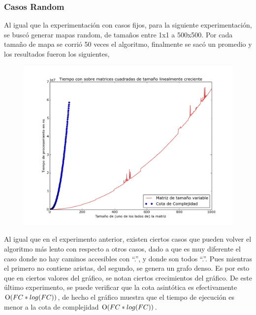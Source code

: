     \subsubsection{Casos Random}

    Al igual que la experimentación con casos fijos, para la siguiente experimentación, se buscó generar mapas random, de tamaños entre 1x1 a 500x500. Por cada tamaño de mapa se corrió 50 veces el algoritmo, finalmente se sacó un promedio y los resultados fueron los siguientes,
    
    \begin{figure}[H]
      \begin{center}
        \includegraphics[width=0.7\columnwidth]{../exp/ej2casosRandom.jpeg}
        \caption{}
      \end{center}
  	\end{figure}

   Al igual que en el experimento anterior, existen ciertos casos que pueden volver el algoritmo más lento con respecto a otros casos, dado a que es muy diferente el caso donde no hay caminos accesibles con “.”, y donde son todos “.”. Pues mientras el primero no contiene aristas, del segundo, se genera un grafo denso. Es por esto que en ciertos valores del gráfico, se notan ciertos crecimientos del gráfico. De este último experimento, se puede verificar que la cota asintótica es efectivamente $\operatorname{O}(FC*log(FC))$, de hecho el gráfico muestra que el tiempo de ejecución es menor a la cota de complejidad $\operatorname{O}(FC*log(FC))$.